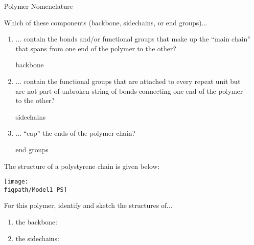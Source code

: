 \begin{activity}{Polymer Nomenclature}
\begin{model}
\end{model}


\begin{ctqs}

	\question Which of these components (backbone, sidechains, or end groups)...
	
		\begin{enumerate}
			\item ... contain the bonds and/or functional groups that make up the ``main chain'' that spans from one end of the polymer to the other?
			
				\begin{solution}[0.25in]
					backbone
				\end{solution}
			
			\item ... contain the functional groups that are attached to every repeat unit but are not part of unbroken string of bonds connecting one end of the polymer to the other?
			
				\begin{solution}[0.25in]
					sidechains
				\end{solution}
			
			\item ... ``cap'' the ends of the polymer chain?
			
				\begin{solution}[0.25in]
					end groups
				\end{solution}
				
		\end{enumerate}
		
	\question The structure of a polystyrene chain is given below:
	
		\centerline{\texttt{[image: \\figpath/Model1\_PS]}}
	
		For this polymer, identify and sketch the structures of...
		\begin{enumerate}
			\item the backbone:
			
				\begin{solution}[0.75in]\studentdisplay{
					~
				}\end{solution}
			
			\item the sidechains:
			

\end{enumerate}
\end{ctqs}
\end{activity}
